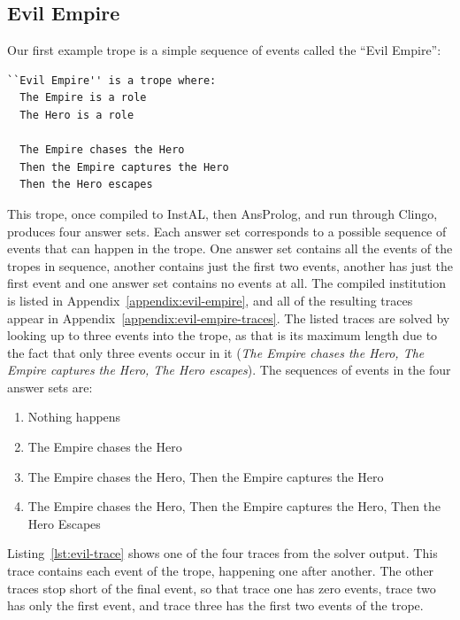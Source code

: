 \documentclass[11pt]{report}
\begin{document}
\subsection{Evil Empire}
Our first example trope is a simple sequence of events called the ``Evil Empire'':

\begin{lstlisting}[label={lst:evil-empire}, caption={The ``Evil Empire'' trope}]
``Evil Empire'' is a trope where:
  The Empire is a role
  The Hero is a role

  The Empire chases the Hero
  Then the Empire captures the Hero
  Then the Hero escapes
\end{lstlisting}

This trope, once compiled to InstAL, then AnsProlog, and run through Clingo,
produces four answer sets. Each answer set corresponds to a possible sequence of
events that can happen in the trope. One answer set contains all the events of
the tropes in sequence, another contains just the first two events, another has
just the first event and one answer set contains no events at all. The compiled institution is listed in
Appendix~\ref{appendix:evil-empire}, and all of the resulting traces appear in
Appendix~\ref{appendix:evil-empire-traces}. The listed traces are solved by
looking up to three events into the trope, as that is its maximum length due to
the fact that only three events occur in it (\emph{The Empire chases the Hero,
  The Empire captures the Hero, The Hero escapes}). The sequences of events in the four
answer sets are:

\begin{enumerate}
  \item Nothing happens
  \item The Empire chases the Hero
  \item The Empire chases the Hero, Then the Empire captures the Hero
  \item The Empire chases the Hero, Then the Empire captures the Hero, Then the
    Hero Escapes
\end{enumerate}

Listing~\ref{lst:evil-trace} shows one of the four traces from the solver
output. This trace contains each event of the trope, happening one after
another. The other traces stop short of the final event, so that trace one has
zero events, trace two has only the first event, and trace three has the first
two events of the trope. 
\end{document}
